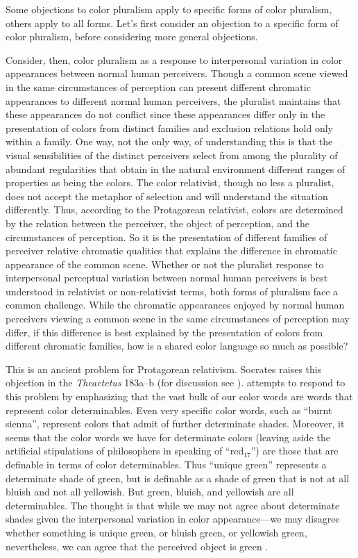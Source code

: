 \documentclass[12pt]{article}
\begin{document}
Some objections to color pluralism apply to specific forms of color pluralism, others apply to all forms. Let's first consider an objection to a specific form of color pluralism, before considering more general objections.

Consider, then, color pluralism as a response to interpersonal variation in color appearances between normal human perceivers. Though a common scene viewed in the same circumstances of perception can present different chromatic appearances to different normal human perceivers, the pluralist maintains that these appearances do not conflict since these appearances differ only in the presentation of colors from distinct families and exclusion relations hold only within a family. One way, not the only way, of understanding this is that the visual sensibilities of the distinct perceivers select from among the plurality of abundant regularities that obtain in the natural environment different ranges of properties as being the colors. The color relativist, though no less a pluralist, does not accept the metaphor of selection and will understand the situation differently. Thus, according to the Protagorean relativist, colors are determined by the relation between the perceiver, the object of perception, and the circumstances of perception. So it is the presentation of different families of perceiver relative chromatic qualities that explains the difference in chromatic appearance of the common scene. Whether or not the pluralist response to interpersonal perceptual variation between normal human perceivers is best understood in relativist or non-relativist terms, both forms of pluralism face a common challenge. While the chromatic appearances enjoyed by normal human perceivers viewing a common scene in the same circumstances of perception may differ, if this difference is best explained by the presentation of colors from different chromatic families, how is a shared color language so much as possible? 

This is an ancient problem for Protagorean relativism. Socrates raises this objection in the \emph{Theaetetus} 183a--b (for discussion see \citealt{Burnyeat:1990dp}). \citet{Kalderon:2006tg} attempts to respond to this problem by emphasizing that the vast bulk of our color words are words that represent color determinables. Even very specific color words, such as ``burnt sienna'', represent colors that admit of further determinate shades. Moreover, it seems that the color words we have for determinate colors (leaving aside the artificial stipulations of philosophers in speaking of ``red\( _{17} \)'') are those that are definable in terms of color determinables. Thus ``unique green'' represents a determinate shade of green, but is definable as a shade of green that is not at all bluish and not all yellowish. But green, bluish, and yellowish are all determinables. The thought is that while we may not agree about determinate shades given the interpersonal variation in color appearance---we may disagree whether something is unique green, or bluish green, or yellowish green, nevertheless, we can agree that the perceived object is green .



\nocite{Cooper:1997fk}
\nocite{Hett:1936fk}
\nocite{Heraclitus:1979uq}

 
 
\end{document}
